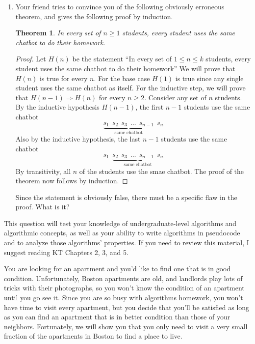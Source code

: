 \documentclass[11pt]{article}
\newtheorem{thm}{Theorem}
\theoremstyle{definition}
\begin{document}
\begin{enumerate}[leftmargin=0pt, itemsep=3ex]
\begin{enumerate}[leftmargin=0pt, itemsep=3ex]
    \item Your friend tries to convince you of the following obviously erroneous theorem, and gives the following proof by induction.
    \begin{thm}
        In every set of $n \geq 1$ students, every student uses the same chatbot to do their homework.
    \end{thm}
    \begin{proof}
        Let $H(n)$ be the statement ``In every set of $1 \leq n \leq k$ students, every student uses the same chatbot to do their homework''  We will prove that $H(n)$ is true for every $n$.  For the base case $H(1)$ is true since any single student  uses the same chatbot as itself.  For the inductive step, we will prove that $H(n-1) \Longrightarrow H(n)$ for every $n \geq 2$.  Consider any set of $n$ students.  By the inductive hypothesis $H(n-1)$, the first $n-1$ students use the same chatbot
        \begin{equation*}
            \underbrace{s_1~~s_2~~s_3~~\dots~~s_{n-1}}_{\text{same chatbot}}~~s_{n}
        \end{equation*}
        Also by the inductive hypothesis, the last $n-1$ students use the same chatbot
        \begin{equation*}
            s_1~~\underbrace{s_2~~s_3~~\dots~~s_{n-1}~~s_{n}}_{\text{same chatbot}}
        \end{equation*}
        By transitivity, all $n$ of the students use the smae chatbot.  The proof of the theorem now follows by induction.
    \end{proof}
    Since the statement is obviously false, there must be a specific flaw in the proof.  What is it?
\end{enumerate}

\problemitem This question will test your knowledge of undergraduate-level algorithms and algorithmic concepts, as well as your ability to write algorithms in pseudocode and to analyze those algorithms' properties.  If you need to review this material, I suggest reading KT Chapters 2, 3, and 5.

You are looking for an apartment and you'd like to find one that is in good condition.  Unfortunately, Boston apartments are old, and landlords play lots of tricks with their photographs, so you won't know the condition of an apartment until you go see it.  Since you are so busy with algorithms homework, you won't have time to visit every apartment, but you decide that you'll be satisfied as long as you can find an apartment that is in better condition than those of your neighbors.  Fortunately, we will show you that you only need to visit a very small fraction of the apartments in Boston to find a place to live.


\end{enumerate}
\end{document}
